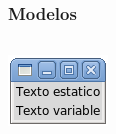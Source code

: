 \documentclass[12pt]{beamer}
\begin{document}
  \begin{frame}
    \label{modelos}
    \frametitle{Modelos}
    \begin{columns}[B]
        \footnotesize
        
        \vspace{20ex}
        \includegraphics[width=\textwidth]{programas/tkinter/capturas/modelo.png}
    \end{columns}
  \end{frame}
\end{document}
